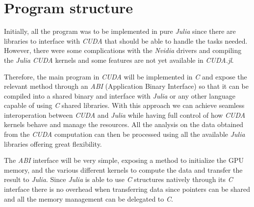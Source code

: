
\section{Program structure}%
\label{sec:structure}

Initially, all the program was to be implemented in pure \emph{Julia} since there are libraries to interface with \emph{CUDA} \cite{noauthor_juliagpu_nodate} that should be able to handle the tasks needed. However, there were some complications with the \emph{Nvidia} drivers and compiling the \emph{Julia} \emph{CUDA} kernels and some features are not yet available in \emph{CUDA.jl}.

Therefore, the main program in \emph{CUDA} will be implemented in \emph{C} and expose the relevant method through an \emph{ABI} (Application Binary Interface) so that it can be compiled into a shared binary and interface with \emph{Julia} or any other language capable of using \emph{C} shared libraries. With this approach we can achieve seamless interoperation between \emph{CUDA} and \emph{Julia} while having full control of how \emph{CUDA} kernels behave and manage the resources. All the analysis on the data obtained from the \emph{CUDA} computation can then be processed using all the available \emph{Julia} libraries offering great flexibility.

The \emph{ABI} interface will be very simple, exposing a method to initialize the GPU memory, and the various different kernels to compute the data and transfer the result to \emph{Julia}. Since \emph{Julia} is able to use \emph{C} structures natively through
its \emph{C} interface there is no overhead when transferring data since pointers can be shared \cite{noauthor_c_nodate} and all the memory management can be delegated
to \emph{C}.







